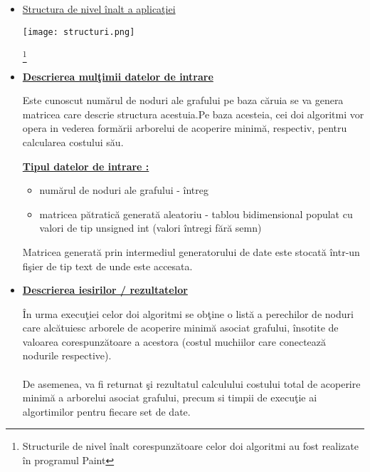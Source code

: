 \documentclass[14pt]{article}
\begin{document}
\begin{itemize}

\item
\underline{\Large{Structura de nivel \^inalt a aplica\c tiei}}
\vspace{10mm}

\begin{center}
\texttt{[image: structuri.png]}
\end{center}   

\vspace{3mm}

\footnote{Structurile de nivel \^inalt corespunz\u{a}toare celor doi algoritmi au fost realizate \^in programul Paint}

\vspace{1mm}
\item
\underline{\Large\textbf{{Descrierea mul\c timii datelor de intrare}}}
\vspace{2mm}

Este cunoscut num\u{a}rul de noduri ale grafului pe baza c\u{a}ruia se va genera matricea care descrie structura acestuia.Pe baza acesteia, cei doi algoritmi vor opera in vederea form\u{a}rii arborelui de acoperire minim\u{a}, respectiv, pentru calcularea costului s\u{a}u.
\newpage

\underline{\textbf{Tipul datelor de intrare :}}\\
\begin{itemize}
    \item 
    num\u{a}rul de noduri ale grafului - \^intreg
    \item
    matricea p\u{a}tratic\u{a} generat\u{a} aleatoriu - tablou bidimensional populat cu valori de tip unsigned int (valori \^intregi f\u{a}r\u{a} semn) 
\end{itemize}

Matricea generat\u{a} prin intermediul generatorului de date este stocat\u{a} \^intr-un fi\c sier de tip text de unde este accesata. 

\vspace{2mm}

\item
\underline{\Large\textbf{Descrierea iesirilor / rezultatelor}}

\vspace{3mm}

\^In urma execu\c tiei celor doi algoritmi se ob\c tine o list\u{a} a perechilor de noduri care alc\u{a}tuiesc arborele de acoperire minim\u{a} asociat grafului, \^insotite de valoarea corespunz\u{a}toare a acestora (costul muchiilor care conecteaz\u{a} nodurile respective).\\
\\
De asemenea, va fi returnat \c si rezultatul calculului costului total de acoperire minim\u{a} a arborelui asociat grafului, precum si timpii de execu\c tie ai algortimilor pentru fiecare set de date.  


\end{itemize}
\end{document}
